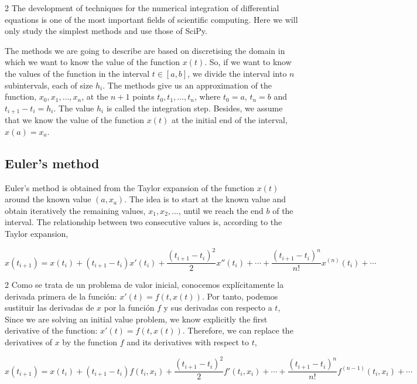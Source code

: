 \begin{paracol}{2}
The development of techniques for the numerical integration of differential equations is one of the most important fields of scientific computing. Here we will only study the simplest methods and use those of SciPy.

The methods we are going to describe are based on discretising the domain in which we want to know the value of the function $x(t)$. So, if we want to know the values of the function in the interval $t \in [a,b]$, we divide the interval into $n$ subintervals, each of size $h_i$. The methods give us an approximation of the function, $x_0,x_1,\dots, x_n$, at the $n+1$ points $t_0,t_1,\dots, t_n$, where $t_0=a$, $t_n=b$ and $t_{i+1}-t_i=h_i$. The value $h_i$ is called the integration step. Besides, we assume that we know the value of the function $x(t)$ at the initial end of the interval, $x(a) = x_a$.

\subsection{Euler's method}
Euler's method is obtained from the Taylor expansion of the function $x(t)$ around the known value $(a,x_a)$. The idea is to start at the known value and obtain iteratively the remaining values, $x_1,x_2,\dots$, until we reach the end $b$ of the interval. The relationship between two consecutive values is, according to the Taylor expansion, 
\end{paracol}
\begin{equation*}
x(t_{i+1})=x(t_i)+(t_{i+1}-t_{i})x'(t_i)+\frac{(t_{i+1}-t_{i})^2}{2}x''(t_i)+\cdots+ \frac{(t_{i+1}-t_i)^n}{n!}x^{(n)}(t_i)+\cdots
\end{equation*}
\begin{paracol}{2}
Como se trata de un problema de valor inicial, conocemos explícitamente la derivada primera de la función: $x'(t)=f(t,x(t))$. Por tanto, podemos sustituir las derivadas de $x$ por la función $f$ y sus derivadas con respecto a $t$,
\switchcolumn
Since we are solving an initial value problem, we know explicitly the first derivative of the function: $x'(t) = f(t,x(t))$. Therefore, we can replace the derivatives of $x$ by the function $f$ and its derivatives with respect to $t$,
\end{paracol}
\begin{equation*}
x(t_{i+1})=x(t_i)+(t_{i+1}-t_{i})f(t_i,x_i)+\frac{(t_{i+1}-t_{i})^2}{2}f'(t_i,x_i)+\cdots+ \frac{(t_{i+1}-t_i)^n}{n!}f^{(n-1)}(t_i,x_i)+\cdots
\end{equation*}
